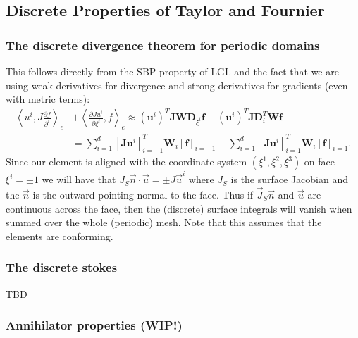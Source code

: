 \documentclass{report}
\newcommand{\inner}[2]{ \left\langle #1, #2 \right\rangle }
\newcommand{\mat}[1]{\boldsymbol #1}
\newcommand{\dvec}[1]{\boldsymbol #1}
\begin{document}
\subsection*{Discrete Properties of Taylor and Fournier}

\subsubsection*{The discrete divergence theorem for periodic domains}

This follows directly from the SBP property of LGL and the fact that we are using weak
derivatives for divergence and strong derivatives for gradients (even with metric terms):
\begin{align}
   \inner{u^{i}}{J \frac{\partial f}{\partial^{i}}}_{e}
   &+
   \inner{\frac{\partial Ju^{i}}{\partial \xi^{i}}}{f}_{e}
   \approx
   {\left(\dvec{u}^{i}\right)}^{T} \mat{J} \mat{W} \mat{D}_{\xi^i} \dvec{f}
   +
   {\left(\dvec{u}^{i}\right)}^{T} \mat{J} \mat{D}^{T}_{i} \mat{W} \dvec{f}
   \nonumber\\
   &=
   \sum_{i=1}^{d} {\left[\mat{J}\dvec{u}^{i}\right]}_{i=-1}^{T} \mat{W}_{i} {\left[\dvec{f}\right]}_{i=-1}
   -
   \sum_{i=1}^{d} {\left[\mat{J}\dvec{u}^{i}\right]}_{i=1}^{T} \mat{W}_{i} {\left[\dvec{f}\right]}_{i=1}.
\end{align}
Since our element is aligned with the coordinate system $(\xi^{1}, \xi^{2}, \xi^{3})$
on face $\xi^{i} = \pm 1$ we will have that $J_{S} \vec{n} \cdot \vec{u} = \pm J \vec{u}^{i}$
where $J_{S}$ is the surface Jacobian and the $\vec{n}$ is the outward pointing normal to the face.
Thus if $\vec{J}_{S} \vec{n}$ and $\vec{u}$ are continuous across the face, then the (discrete)
surface integrals will vanish when summed over the whole (periodic) mesh.
Note that this assumes that the elements are conforming.

\subsubsection*{The discrete stokes}

TBD

\subsubsection*{Annihilator properties (WIP!)}
\end{document}
